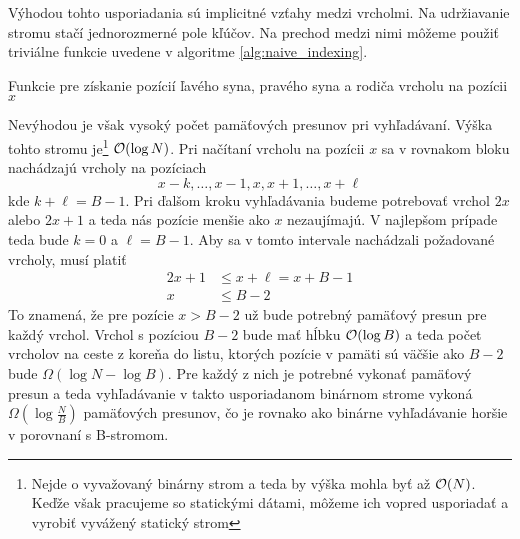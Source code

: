 Výhodou tohto usporiadania sú implicitné vzťahy medzi vrcholmi. Na udržiavanie stromu stačí jednorozmerné pole kľúčov. Na prechod medzi nimi môžeme použiť triviálne funkcie uvedene v algoritme \ref{alg:naive_indexing}.

\begin{algorithm}[H]
	\caption{Funkcie pre získanie pozícií ľavého syna, pravého syna a rodiča vrcholu na pozícii $x$}
    \label{alg:naive_indexing}
	\begin{minipage}[t]{0.3\textwidth}
	    \begin{algorithmic}[1]
	            \State {}
	        \EndFunction
	    \end{algorithmic}
	\end{minipage} \hfill
	\begin{minipage}[t]{0.3\textwidth}
	    \begin{algorithmic}[1]
	            \State {}
	        \EndFunction
	    \end{algorithmic}
	\end{minipage} \hfill
	\begin{minipage}[t]{0.3\textwidth}
	    \begin{algorithmic}[1]
	            \State {}
	        \EndFunction
	    \end{algorithmic}
	\end{minipage}
\end{algorithm}

Nevýhodou je však vysoký počet pamäťových presunov pri vyhľadávaní. Výška tohto stromu je\footnote{Nejde o vyvažovaný binárny strom a teda by výška mohla byť až $\mathcal{O}(N)$. Keďže však pracujeme so statickými dátami, môžeme ich vopred usporiadať a vyrobiť vyvážený statický strom} $\mathcal{O}(\log{N})$. Pri načítaní vrcholu na pozícii $x$ sa v rovnakom bloku nachádzajú vrcholy na pozíciach
\[
x-k,\dotsc,x-1,x,x+1,\dotsc,x+\ell
\]
kde $k+\ell=B-1$. Pri ďalšom kroku vyhľadávania budeme potrebovať vrchol $2x$ alebo $2x+1$ a teda nás pozície menšie ako $x$ nezaujímajú. V najlepšom prípade teda bude $k=0$ a $\ell=B-1$. Aby sa v tomto intervale nachádzali požadované vrcholy, musí platiť
\[
\begin{aligned}
2x+1 &\le x+\ell = x+B-1 \\
x &\le B-2
\end{aligned}
\]
To znamená, že pre pozície $x > B - 2$ už bude potrebný pamäťový presun pre každý vrchol. Vrchol s pozíciou $B-2$ bude mať hĺbku $\mathcal{O}(\log{B})$ a teda počet vrcholov na ceste z koreňa do listu, ktorých pozície v pamäti sú väčšie ako $B-2$ bude $\Omega(\log{N}-\log{B})$. Pre každý z nich je potrebné vykonať pamäťový presun a teda vyhľadávanie v takto usporiadanom binárnom strome vykoná $\Omega(\log{\frac{N}{B}})$ pamäťových presunov, čo je rovnako ako binárne vyhľadávanie horšie v porovnaní s \aware B-stromom.

